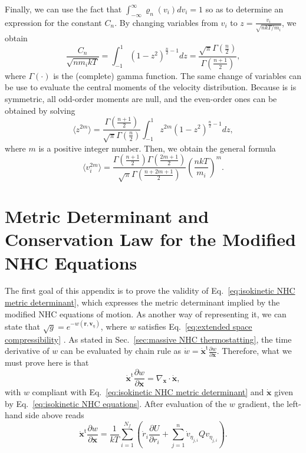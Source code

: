 \documentclass[
aip,
jcp,
reprint,
]{revtex4-1}
\newcommand{\vt}[1]{\boldsymbol{\mathbf{#1}}}          %
\newcommand{\tr}[1]{#1^\text{t}}                       %
\newcommand{\diff}[2]{\frac{\partial #2}{\partial #1}} %
\newcommand{\nn}{n}
\begin{document}
Finally, we can use the fact that $\int_{-\infty}^\infty \varrho_n(v_i) dv_i = 1$ so as to determine an expression for the constant $C_n$.
By changing variables from $v_i$ to $z = \frac{v_i}{\sqrt{{\nn k T}/{m_i}}}$, we obtain
\begin{equation}
\frac{C_n}{\sqrt{\nn m_i k T}} = \int_{-1}^{1} (1-z^2)^{\frac{\nn}{2}-1} dz = \frac{\sqrt{\pi} \Gamma\left(\frac{\nn}{2}\right)}{\Gamma\left(\frac{\nn+1}{2}\right)},
\end{equation}
where $\Gamma(\cdot)$ is the (complete) gamma function.
The same change of variables can be use to evaluate the central moments of the velocity distribution.
Because is is symmetric, all odd-order moments are null, and the even-order ones can be obtained by solving
\begin{equation}
\langle z^{2m} \rangle = \frac{\Gamma\left(\frac{\nn+1}{2}\right)}{\sqrt{\pi} \Gamma\left(\frac{\nn}{2}\right)} \int_{-1}^{1} z^{2m} (1-z^2)^{\frac{\nn}{2}-1} dz,
\end{equation}
where $m$ is a positive integer number.
Then, we obtain the general formula
\begin{equation}
\langle v_i^{2m} \rangle = \frac{\Gamma\left(\frac{\nn+1}{2}\right) \Gamma\left(\frac{2m+1}{2}\right)}{\sqrt{\pi}\Gamma\left(\frac{\nn+2m+1}{2}\right)} \left(\frac{\nn k T}{m_i}\right)^m.
\end{equation}

\section{Metric Determinant and Conservation Law for the Modified NHC Equations}
\label{sec:adapted NHC proofs}

The first goal of this appendix is to prove the validity of Eq.~\eqref{eq:isokinetic NHC metric determinant}, which expresses the metric determinant implied by the modified NHC equations of motion.
As another way of representing it, we can state that $\sqrt{g} = e^{-w(\vt r, \vt v_\eta)}$, where $w$ satisfies Eq.~\eqref{eq:extended space compressibility} \cite{Tuckerman_1999, Tuckerman_2001}.
As stated in Sec.~\ref{sec:massive NHC thermostatting}, the time derivative of $w$ can be evaluated by chain rule as $\dot{w} = \tr{\dot{\vt x}} \diff{\vt x}{w}$.
Therefore, what we must prove here is that \cite{Ezra_2004}
\begin{equation}
\label{eq:metric determinant proof equality}
\tr{\dot{\vt x}} \diff{\vt x}{w} = \nabla_{\vt x} \cdot \dot{\vt x},
\end{equation}
with $w$ compliant with Eq.~\eqref{eq:isokinetic NHC metric determinant} and $\dot{\vt x}$ given by Eq.~\eqref{eq:isokinetic NHC equations}.
After evaluation of the $w$ gradient, the left-hand side above reads
\begin{equation*}
\tr{\dot{\vt x}} \diff{\vt x}{w} = \frac{1}{kT} \sum_{i=1}^{N_f} \left(\dot{r}_i \diff{r_i}{U} + \sum_{j=1}^\nn \dot{v}_{\eta_{j,i}} Q v_{\eta_{j,i}} \right).
\end{equation*}
\end{document}
